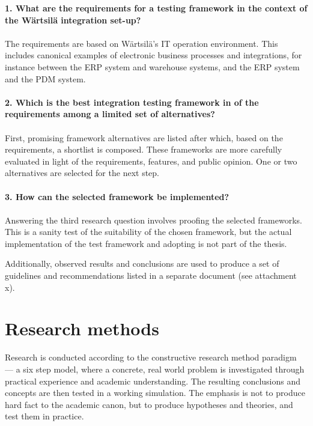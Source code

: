 \documentclass[12pt,a4paper,oneside,pdftex]{report}
\begin{document}
\begin{adjustwidth}{2.5em}{0pt}
\textbf{1. What are the requirements for a testing framework in the context of the W{\"a}rtsil{\"a} integration set-up?} \\
\\
The requirements are based on W{\"a}rtsil{\"a}'s IT operation environment. This includes canonical examples of electronic business processes and integrations, for instance between the ERP system and warehouse systems, and the ERP system and the PDM system. \\
\\
\textbf{2. Which is the best integration testing framework in of the requirements among a limited set of alternatives?} \\
\\
First, promising framework alternatives are listed after which, based on the requirements, a shortlist is composed. These frameworks are more carefully evaluated in light of the requirements, features, and public opinion. One or two alternatives are selected for the next step. \\
\\
\textbf{3. How can the selected framework be implemented?} \\
\\
Answering the third research question involves proofing the selected frameworks. This is a sanity test of the suitability of the chosen framework, but the actual implementation of the test framework and adopting is not part of the thesis. \\
\end{adjustwidth}

Additionally, observed results and conclusions are used to produce a set of guidelines and recommendations listed in a separate document (see attachment x). %

\section{Research methods}
Research is conducted according to the constructive research method paradigm --- a six step model, where a concrete, real world problem is investigated through practical experience and academic understanding. The resulting conclusions and concepts are then tested in a working simulation. The emphasis is not to produce hard fact to the academic canon, but to produce hypotheses and theories, and test them in practice.
\end{document}
